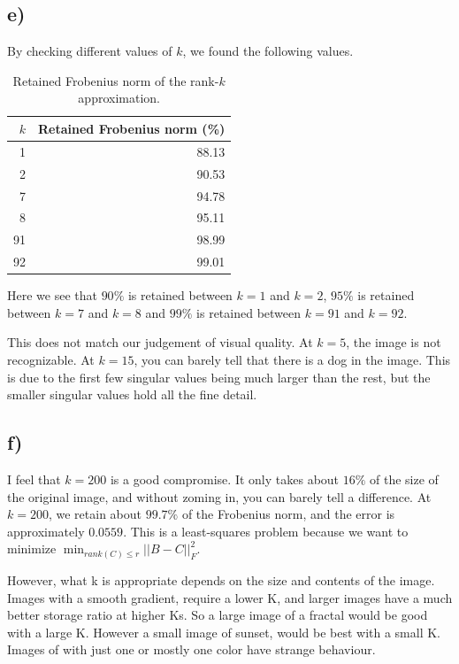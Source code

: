 \documentclass[conference]{IEEEtran}
\begin{document}
\subsection{e)}

By checking different values of $k$, we found the following values. 

\begin{table}[H]
  \centering
  \caption{Retained Frobenius norm of the rank-$k$ approximation.}
  \label{tab:frobenius}
  \begin{tabular}{rr}
    \toprule
    $k$ & Retained Frobenius norm (\%) \\
    \midrule
    1  & 88.13 \\
    2  & 90.53 \\
    7  & 94.78 \\
    8  & 95.11 \\
    91 & 98.99 \\
    92 & 99.01 \\
    \bottomrule
  \end{tabular}
\end{table}

Here we see that $90\%$ is retained between $k=1$ and $k=2$, $95\%$ is retained between $k=7$ and $k=8$ and $99\%$ is retained between $k=91$ and $k=92$. 
\newline

This does not match our judgement of visual quality. At $k=5$, the image is not recognizable. At $k=15$, you can barely tell that there is a dog in the image. This is due to the first few singular values being much larger than the rest, but the smaller singular values hold all the fine detail. 

\subsection{f)}

I feel that $k=200$ is a good compromise. It only takes about $16\%$ of the size of the original image, and without zoming in, you can barely tell a difference. At $k=200$, we retain about $99.7\%$ of the Frobenius norm, and the error is approximately $0.0559$. This is a least-squares problem because we want to minimize $\min_{rank(C)\leq r}||B-C||_F^2$. 

However, what k is appropriate depends on the size and contents of the image. 
Images with a smooth gradient, require a lower K, and larger images have a much better storage ratio at higher Ks. So a large image of a fractal would be good with a large K. However a small image of sunset, would be best with a small K. Images of with just one or mostly one color have strange behaviour. 
\end{document}
